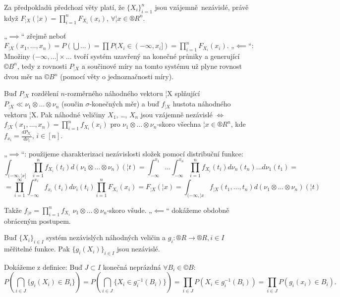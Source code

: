 \documentclass[12pt]{article}					%
\begin{document}
\begin{veta}
	Za předpokladů předchozí věty platí, že $\{X_i\}_{i=1}^n$ jsou vzájemně nezávislé, právě když $F_{¦X}(¦x) = \prod_{i=1}^n F_{X_i}(x_i)$, $\forall ¦x \in ®R^n$.

	\begin{dukazin}
		„$\implies$“ zřejmě neboť $F_{¦X}(x_1, …, x_n) = P(\bigcup …) = \prod P(X_i \in (-∞, x_i]) = \prod_{i=1}^n F_{X_i}(x_i)$. „$\impliedby$“: Množiny $(-∞, …] \times …$ tvoří systém uzavřený na konečné průniky a generující $©B^n$, tedy z rovnosti $P_{¦X}$ a součinové míry na tomto systému už plyne rovnost dvou měr na $©B^n$ (pomocí věty o jednoznačnosti míry).
	\end{dukazin}
\end{veta}


\begin{veta}
	Buď $P_{¦X}$ rozdělení $n$-rozměrného náhodného vektoru ¦X splňující $P_{¦X} \ll \nu_1\otimes … \otimes \nu_n$ (součin $\sigma$-konečných měr) a buď $f_{¦X}$ hustota náhodného vektoru ¦X. Pak náhodné veličiny $X_1$, …, $X_n$ jsou vzájemně nezávislé $\Leftrightarrow$ $f_{¦X} (x_1, …, x_n) = \prod_{i=1}^n f_{X_i}(x_i)$ pro $\nu_1 \otimes … \otimes \nu_n$-skoro všechna $¦x \in ®R^n$, kde $f_{x_i} = \frac{dP_{X_i}}{d\nu_i}$, $i \in [n]$.

	\begin{dukazin}
		„$\implies$“: použijeme charakterizaci nezávislosti složek pomocí distribuční funkce:
		$$ \int_{(-∞, ¦x]} \prod_{i=1}^n f_{X_i}(t_i) d(\nu_1 \otimes … \otimes \nu_n)(¦t) = \int_{-∞}^{x_1} … \int_{-∞}^{x_n} \prod_{i=1}^n f_{X_i}(t_i) d\nu_n(t_n) … d\nu_1(t_1) = $$
		$$ = \prod_{i=1}^∞ \int_{-∞}^{x_i} f_{x_i}(t_i) d\nu_i(t_i)\prod_{i=1}^n F_{X_i}(x_i) = F_{¦X}(¦x) = \int_{(-∞, ¦x} f_{¦X} (t_1, …, t_n) d(\nu_1 \otimes … \otimes \nu_n) (¦t) $$

		Takže $f_{¦x} = \prod_{i=1}^n f_{X_i}$ $\nu_1 \otimes … \otimes \nu_n$-skoro všude. „$\impliedby$“ dokážeme obdobně obráceným postupem.
	\end{dukazin}
\end{veta}

\begin{veta}
	Buď $\{X_i\}_{i \in I}$ systém nezávislých náhodných veličin a $g_i: ®R \rightarrow ®R, i \in I$ měřitelné funkce. Pak $\{g_i(X_i)\}_{i \in I}$ jsou nezávislé.

	\begin{dukazin}
		Dokážeme z definice: Buď $J \subset I$ konečná neprázdná $\forall B_i \in ©B:$
		$$ P(\bigcap_{i \in J} \{g_i(X_i) \in B_i\}) = P(\bigcap_{i \in J} \{X_i \in g_i^{-1}(B_i)\}) = \prod_{i \in J} P(X_i \in g_i^{-1}(B_i)) = \prod_{i \in J} P(g_i(x_i) \in B_i). $$
	\end{dukazin}
\end{veta}
\end{document}
